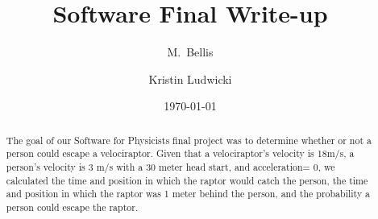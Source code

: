 \documentclass[twocolumn]{revtex4-1}
\begin{document}
\title{
Software Final Write-up
}

\author{M.~Bellis}
\author{Kristin Ludwicki}

\date{\today}

\begin{abstract}
    The goal of our Software for Physicists final project was to determine whether or not a person could escape a velociraptor.
Given that a velociraptor's velocity is 18m/s, a person's velocity is 3 m/s with a 30 meter head start, and acceleration= 0, we calculated the time and position in which the raptor would catch the person, the time and position in which the raptor was 1 meter behind the person, and the probability a person could escape the raptor. 
\end{abstract}
\end{document}
